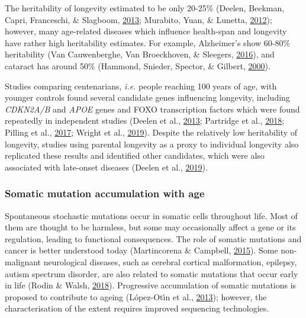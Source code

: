 \documentclass[12pt,twoside]{unicam}
\begin{document}
The heritability of longevity estimated to be only 20-25\% (Deelen, Beekman, Capri, Franceschi, \& Slagboom, \protect\hyperlink{ref-Deelen2013}{2013}; Murabito, Yuan, \& Lunetta, \protect\hyperlink{ref-Murabito2012}{2012}); however, many age-related diseases which influence health-span and longevity have rather high heritability estimates. For example, Alzheimer's show 60-80\% heritability (Van Cauwenberghe, Van Broeckhoven, \& Sleegers, \protect\hyperlink{ref-VanCauwenberghe2016}{2016}), and cataract has around 50\% (Hammond, Snieder, Spector, \& Gilbert, \protect\hyperlink{ref-Hammond2000}{2000}).

Studies comparing centenarians, \emph{i.e.} people reaching 100 years of age, with younger controls found several candidate genes influencing longevity, including \emph{CDKN2A/B} and \emph{APOE} genes and FOXO transcription factors which were found repeatedly in independent studies (Deelen et al., \protect\hyperlink{ref-Deelen2013}{2013}; Partridge et al., \protect\hyperlink{ref-Partridge2018}{2018}; Pilling et al., \protect\hyperlink{ref-Pilling2017}{2017}; Wright et al., \protect\hyperlink{ref-Wright2019}{2019}). Despite the relatively low heritability of longevity, studies using parental longevity as a proxy to individual longevity also replicated these results and identified other candidates, which were also associated with late-onset diseases (Deelen et al., \protect\hyperlink{ref-Deelen2019}{2019}).

\hypertarget{somatic-mutation-accumulation-with-age}{%
\subsubsection{Somatic mutation accumulation with age}\label{somatic-mutation-accumulation-with-age}}

Spontaneous stochastic mutations occur in somatic cells throughout life. Most of them are thought to be harmless, but some may occasionally affect a gene or its regulation, leading to functional consequences. The role of somatic mutations and cancer is better understood today (Martincorena \& Campbell, \protect\hyperlink{ref-Martincorena2015}{2015}). Some non-malignant neurological diseases, such as cerebral cortical malformation, epilepsy, autism spectrum disorder, are also related to somatic mutations that occur early in life (Rodin \& Walsh, \protect\hyperlink{ref-Rodin2018}{2018}). Progressive accumulation of somatic mutations is proposed to contribute to ageing (López-Otı́n et al., \protect\hyperlink{ref-Lopez-Otin2013}{2013}); however, the characterisation of the extent requires improved sequencing technologies.
\end{document}
